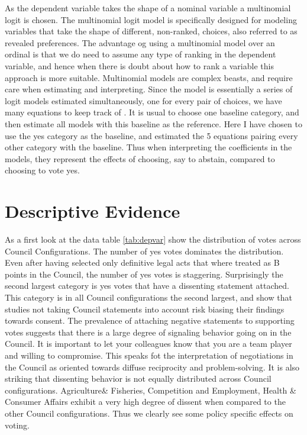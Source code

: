 As the dependent variable takes the shape of a nominal variable a multinomial logit is chosen. The multinomial logit model is specifically designed for modeling variables that take the shape of different, non-ranked, choices, also referred to as revealed preferences. The advantage og using a multinomial model over an ordinal is that we do need to assume any type of ranking in the dependent variable, and hence when there is doubt about how to rank a variable this approach is more suitable. Multinomial models are complex beasts, and require care when estimating and interpreting. Since the  model is essentially a series of logit models estimated simultaneously, one for every pair of choices, we have many equations to keep track of \citep[CHapter 6]{Long1997}. It is usual to choose one baseline category, and then estimate all models with this baseline as the reference. Here I have chosen to use the yes category as the baseline, and estimated the 5 equations pairing every other category with the baseline. Thus when interpreting the coefficients in the models, they represent the effects of choosing, say to abstain, compared to choosing to vote yes. 



\section{Descriptive Evidence}
As a first look at the data table \ref{tab:depvar} show the distribution of votes across Council Configurations. The number of yes votes dominates the distribution. Even after having selected only definitive legal acts that where treated as B points in the Council, the number of yes votes is staggering. Surprisingly the second largest category is yes votes that have a dissenting statement attached. This category is in all Council configurations the second largest, and show that studies not taking Council statements into account risk biasing their findings towards consent. The prevalence of attaching negative statements to supporting votes suggests that there is a large degree of signaling behavior going on in the Council. It is important to let your colleagues know that you are a team player and willing to compromise. This speaks fot the interpretation of negotiations in the Council as oriented towards diffuse reciprocity and problem-solving. It is also striking that dissenting behavior is not equally distributed across Council configurations. Agriculture\& Fisheries, Competition and Employment, Health \& Consumer Affairs exhibit a very high degree of dissent when compared to the other Council configurations. Thus we clearly see some policy specific effects on voting.


